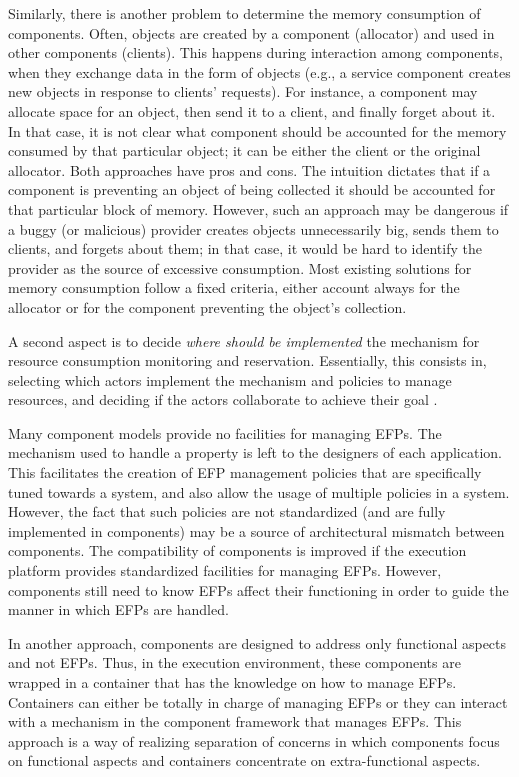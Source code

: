 Similarly, there is another problem to determine the memory consumption of components.
Often, objects are created by a component (allocator) and used in other components (clients).
This happens during interaction among components, when they exchange data in the form of objects (e.g., a service component creates new objects in response to clients' requests).
For instance, a component may allocate space for an object, then send it to a client, and finally forget about it.
In that case, it is not clear what component should be accounted for the memory consumed by that particular object; it can be either the client or the original allocator.
Both approaches have pros and cons.
The intuition dictates that if a component is preventing an object of being collected it should be accounted for that particular block of memory.
However, such an approach may be dangerous if a buggy (or malicious) provider creates objects unnecessarily big, sends them to clients, and forgets about them; in that case, it would be hard to identify the provider as the source of excessive consumption. 
Most existing solutions for memory consumption follow a fixed criteria, either account always for the allocator or for the component preventing the object's collection.

A second aspect is to decide \textit{where should be implemented} the mechanism for resource consumption monitoring and reservation.
Essentially, this consists in, selecting which actors implement the mechanism and policies to manage resources, and deciding if the actors collaborate to achieve their goal \cite{Crnkovic2011}.

Many component models provide no facilities for managing \glspl{EFP}.
The mechanism used to handle a property is left to the designers of each application.
This facilitates the creation of EFP management policies that are specifically tuned towards a system, and also allow the usage of multiple policies in a system.
However, the fact that such policies are not
standardized (and are fully implemented in components) may be a source of architectural mismatch between
components.
The compatibility of components is improved if the
execution platform provides standardized facilities for managing EFPs.
However, components still need to know EFPs affect their functioning in order to guide the manner
in which EFPs are handled.

In another approach, components are designed to address only functional aspects and not EFPs.
Thus, in the execution environment, these components
are wrapped in a container that has the knowledge on how to manage EFPs.
Containers can either be totally in charge of managing EFPs or
they can interact with a mechanism in the component framework that manages EFPs.
This approach is a way of realizing separation of
concerns in which components focus on functional aspects
and containers concentrate on extra-functional aspects.

